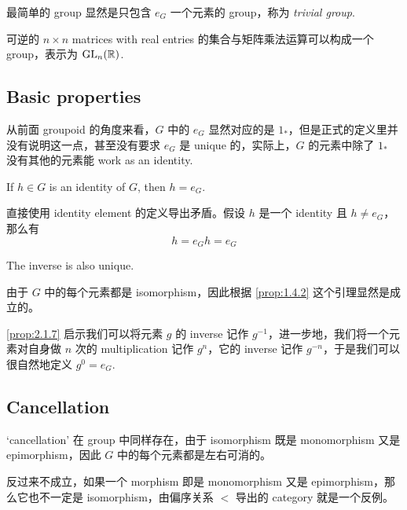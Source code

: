 最简单的 group 显然是只包含 \(e_{G}\) 一个元素的 group，称为 \emph{trivial group}.

\begin{eg}\label{eg:2.1.5}
    可逆的 \(n \times n\) matrices with real entries 的集合与矩阵乘法运算可以构成一个 group，表示为 \(\operatorname{GL}_{n}(\mathbb{R})\).
\end{eg}

\subsection{Basic properties}\label{sec:2.1.3}

从前面 groupoid 的角度来看，\(G\) 中的 \(e_G\) 显然对应的是 \(1_{*}\)，但是正式的定义里并没有说明这一点，甚至没有要求 \(e_G\) 是 unique 的，实际上，\(G\) 的元素中除了 \(1_{*}\) 没有其他的元素能 work as an identity.

\begin{proposition}\label{prop:2.1.6}
    If \(h \in G\) is an identity of \(G\), then \(h = e_G\).
\end{proposition}
\begin{explanation}
    直接使用 identity element 的定义导出矛盾。假设 \(h\) 是一个 identity 且 \(h \not= e_G\)，那么有
    \[h = e_{G} h = e_{G}\]
\end{explanation}

\begin{proposition}\label{prop:2.1.7}
    The inverse is also unique.
\end{proposition}
\begin{explanation}
    由于 \(G\) 中的每个元素都是 isomorphism，因此根据 \autoref{prop:1.4.2} 这个引理显然是成立的。
\end{explanation}

\autoref{prop:2.1.7} 启示我们可以将元素 \(g\) 的 inverse 记作 \(g^{-1}\)，进一步地，我们将一个元素对自身做 \(n\) 次的 multiplication 记作 \(g^n\)，它的 inverse 记作 \(g^{-n}\)，于是我们可以很自然地定义 \(g^0 = e_G\).

\subsection{Cancellation}\label{sec:2.1.4}

`cancellation' 在 group 中同样存在，由于 isomorphism 既是 monomorphism 又是 epimorphism，因此 \(G\) 中的每个元素都是左右可消的。

\begin{note}
    反过来不成立，如果一个 morphism 即是 monomorphism 又是 epimorphism，那么它也不一定是 isomorphism，由偏序关系 \(<\) 导出的 category 就是一个反例。
\end{note}

